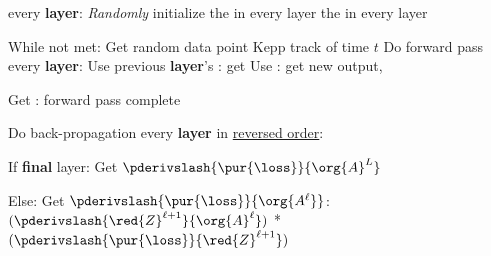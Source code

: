         \begin{codebox}
            
            \li \For every \textbf{layer}:
                \Do
                \li \textit{Randomly} initialize
                    \Do
                    \li the  in every layer
                    \li the  in every layer
                    \End
                \End
                \li
            
            \li While  not met:
                \Do
                    \li Get random data point 
                    \li Kepp track of time $t$
                    \li
                    \li Do forward pass
                        \Do
                            \li \For every \textbf{layer}:
                                \Do
                                    \li Use previous \textbf{layer}'s : get 
                                    \li Use : get new output, 
                                \End
                                \li
                            
                            \li Get : forward pass complete
                        \End
                        \li
                    
                    \li Do back-propagation
                        \Do
                            \li \For every \textbf{layer} in \underline{reversed order}:
                            
                            \Do
                                \li If \textbf{final} layer:
                                    \Do
                                        \li Get $\pderivslash{ \pur{\loss} }{ \org{A}^L }$
                                    \End
                                    \li
                                
                                \li Else: 
                                    \Do
                                        \li Get $\pderivslash{ \pur{\loss} }{ \org{A^\ell} }$:
                                            \Do
                                                \li 
                                                $( \pderivslash{ \red{Z}^{\ell+1} }{ \org{A}^\ell } )$ 
                                                \;*\; 
                                                $( \pderivslash{ \pur{\loss} }{ \red{Z}^{\ell+1} } )$ 
                                            \End
                                            \li 
                                             

\end{codebox}
